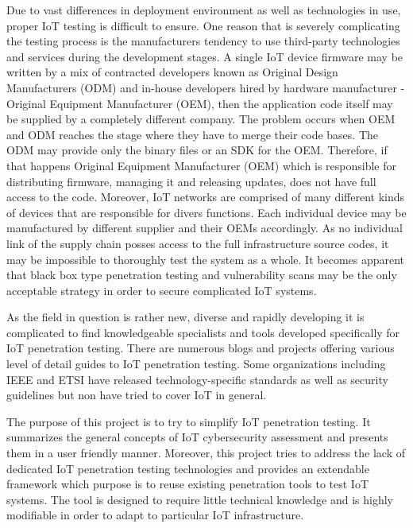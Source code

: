 Due to vast differences in deployment environment as well as technologies in use, proper IoT testing is difficult to ensure. One reason that is severely complicating the testing process is the manufacturers tendency to use third-party technologies and services during the development stages. A single IoT device firmware may be written by a mix of contracted developers known as Original Design Manufacturers (ODM) and in-house developers hired by hardware manufacturer - Original Equipment Manufacturer (OEM), then the application code itself may be supplied by a completely different company\cite{cookbook}. The problem occurs when OEM and ODM reaches the stage where they have to merge their code bases. The ODM may provide only the binary files or an SDK for the OEM. Therefore, if that happens Original Equipment Manufacturer (OEM) which is responsible for distributing firmware, managing it and releasing updates, does not have full access to the code. Moreover, IoT networks are comprised of many different kinds of devices that are responsible for divers functions. Each individual device may be manufactured by different supplier and their OEMs accordingly. As no individual link of the supply chain posses access to the full infrastructure source codes, it may be impossible to thoroughly test the system as a whole. It becomes apparent that black box type penetration testing and vulnerability scans may be the only acceptable strategy in order to secure complicated IoT systems.

As the field in question is rather new, diverse and rapidly developing it is complicated to find knowledgeable specialists and tools developed specifically for IoT penetration testing. There are numerous blogs and projects offering various level of detail guides to IoT penetration testing\cite{github}. Some organizations including IEEE and ETSI have released technology-specific standards as well as security guidelines but non have tried to cover IoT in general\cite{Zhao:2013:SIT:2584913.2585964}. 

The purpose of this project is to try to simplify IoT penetration testing. It summarizes the general concepts of IoT cybersecurity assessment and presents them in a user friendly manner. Moreover, this project tries to address the lack of dedicated IoT penetration testing technologies and provides an extendable framework which purpose is to reuse existing penetration tools to test IoT systems. The tool is designed to require little technical knowledge and is highly modifiable in order to adapt to particular IoT infrastructure.

